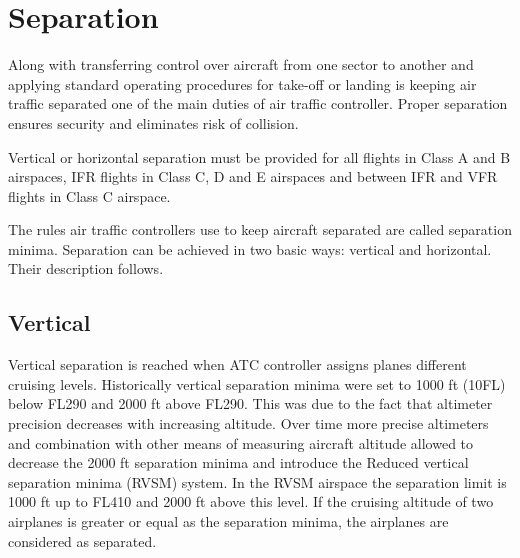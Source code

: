 



\section{Separation}

Along with transferring control over aircraft from one sector to another and applying standard operating procedures for take-off or landing is keeping air traffic separated one of the main duties of air traffic controller. Proper separation ensures security and eliminates risk of collision. \cite[Chapter 2]{order7110}

Vertical or horizontal separation must be provided for all flights in Class A and B airspaces, IFR flights in Class C, D and E airspaces and between IFR and VFR flights in Class C airspace. \cite[Chapter 5]{doc4444}

The rules air traffic controllers use to keep aircraft separated are called separation minima. Separation can be achieved in two basic ways: vertical and horizontal. Their description follows.

\subsection{Vertical}

Vertical separation is reached when ATC controller assigns planes different cruising levels. Historically vertical separation minima were set to 1000 ft (10FL) below FL290 and 2000 ft above FL290. This was due to the fact that altimeter precision decreases with increasing altitude. Over time more precise altimeters and combination with other means of measuring aircraft altitude allowed to decrease the 2000 ft separation minima and introduce the Reduced vertical separation minima (RVSM) system. In the RVSM airspace the separation limit is 1000 ft up to FL410 and 2000 ft above this level. If the cruising altitude of two airplanes is greater or equal as the separation minima, the airplanes are considered as separated. \cite{aim}

